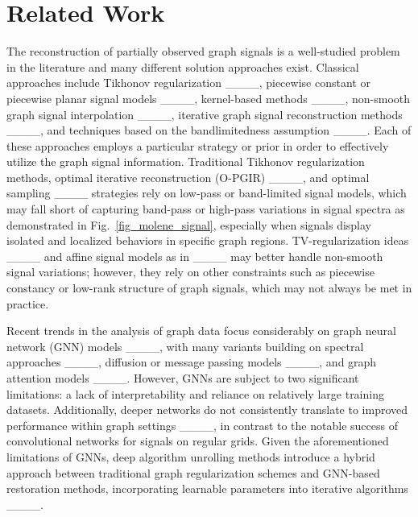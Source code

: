\section{Related Work}
\label{sec_related_work}




The reconstruction of partially observed graph signals is a well-studied problem in the literature and many different solution approaches exist. Classical approaches include Tikhonov regularization ____, piecewise constant or piecewise planar signal models ____, kernel-based methods ____, non-smooth graph signal interpolation ____, iterative graph signal reconstruction methods ____, and techniques based on the bandlimitedness assumption ____. Each of these approaches employs a particular strategy or prior in order to effectively utilize the graph signal information. Traditional Tikhonov regularization methods, optimal iterative reconstruction (O-PGIR) ____, and optimal sampling  ____ strategies rely on low-pass or band-limited signal models, which may fall short of capturing band-pass or high-pass variations in signal spectra as demonstrated in Fig.~\ref{fig_molene_signal},  especially when signals display isolated and localized behaviors in specific graph regions. TV-regularization ideas ____ and affine signal models as in ____ may better handle non-smooth signal variations; however, they rely on other constraints such as piecewise constancy or low-rank structure of graph signals, which may not always be met in practice.








Recent trends in the analysis of graph data focus considerably on graph neural network (GNN) models ____, with many variants building on spectral approaches ____, diffusion or message passing models ____, and graph attention models ____.  However, GNNs are subject to two significant limitations: a lack of interpretability and reliance on relatively large training datasets. Additionally, deeper networks do not consistently translate to improved performance within graph settings ____, in contrast to the notable success of convolutional networks for signals on regular grids. Given the aforementioned limitations of GNNs, deep algorithm unrolling methods introduce a hybrid approach between traditional graph regularization schemes and GNN-based restoration methods, incorporating learnable parameters into iterative algorithms ____. 

